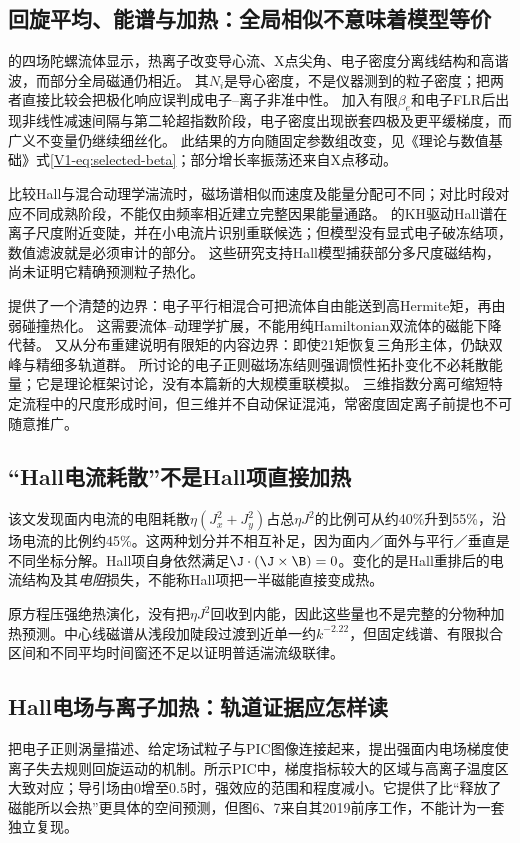 \documentclass[UTF8,a4paper,11pt,openany,fontset=fandol]{ctexbook}
\begin{document}
\subsection{回旋平均、能谱与加热：全局相似不意味着模型等价}
\citet{E471}的四场陀螺流体显示，热离子改变导心流、X点尖角、电子密度分离线结构和高谐波，而部分全局磁通仍相近。
其$N_i$是导心密度，不是仪器测到的粒子密度；把两者直接比较会把极化响应误判成电子--离子非准中性。
\citet{E474}加入有限$\beta_e$和电子FLR后出现非线性减速间隔与第二轮超指数阶段，电子密度出现嵌套四极及更平缓梯度，而广义不变量仍继续细丝化。
此结果的方向随固定参数组改变，见《理论与数值基础》式\eqref{V1-eq:selected-beta}；部分增长率振荡还来自X点移动。

\citet{L264}比较Hall与混合动理学湍流时，磁场谱相似而速度及能量分配可不同；对比时段对应不同成熟阶段，不能仅由频率相近建立完整因果能量通路。
\citet{F644}的KH驱动Hall谱在离子尺度附近变陡，并在小电流片识别重联候选；但模型没有显式电子破冻结项，数值滤波就是必须审计的部分。
这些研究支持Hall模型捕获部分多尺度磁结构，尚未证明它精确预测粒子热化。

\citet{E512}提供了一个清楚的边界：电子平行相混合可把流体自由能送到高Hermite矩，再由弱碰撞热化。
这需要流体--动理学扩展，不能用纯Hamiltonian双流体的磁能下降代替。
\citet{E553}又从分布重建说明有限矩的内容边界：即使21矩恢复三角形主体，仍缺双峰与精细多轨道群。
\citet{L313}所讨论的电子正则磁场冻结则强调惯性拓扑变化不必耗散能量；它是理论框架讨论，没有本篇新的大规模重联模拟。
三维指数分离可缩短特定流程中的尺度形成时间，但三维并不自动保证混沌，常密度固定离子前提也不可随意推广。

\subsection{“Hall电流耗散”不是Hall项直接加热}
该文发现面内电流的电阻耗散$\eta(J_x^2+J_y^2)$占总$\eta J^2$的比例可从约40\%升到55\%，沿场电流的比例约45\%。这两种划分并不相互补足，因为面内／面外与平行／垂直是不同坐标分解。Hall项自身依然满足$\J\cdot(\J\times\B)=0$。变化的是Hall重排后的电流结构及其\emph{电阻}损失，不能称Hall项把一半磁能直接变成热。

原方程压强绝热演化，没有把$\eta J^2$回收到内能，因此这些量也不是完整的分物种加热预测。中心线磁谱从浅段加陡段过渡到近单一约$k^{-2.22}$，但固定线谱、有限拟合区间和不同平均时间窗还不足以证明普适湍流级联律。\citep{L263}

\subsection{Hall电场与离子加热：轨道证据应怎样读}\label{sec:synthesis-heating}
\citet{L272}把电子正则涡量描述、给定场试粒子与PIC图像连接起来，提出强面内电场梯度使离子失去规则回旋运动的机制。所示PIC中，梯度指标较大的区域与高离子温度区大致对应；导引场由0增至0.5时，强效应的范围和程度减小。它提供了比“释放了磁能所以会热”更具体的空间预测，但图6、7来自其2019前序工作，不能计为一套独立复现。
\end{document}
